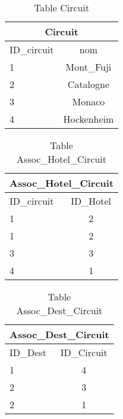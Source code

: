 \documentclass[10pt]{article}
\begin{document}

\begin{table}[h]
\begin{center}
\begin{tabular}{|l|c|}
\hline
\multicolumn{2}{|c|}{Circuit}\\
\hline
ID\_circuit& nom \\
\hline
1 & Mont\_Fuji\\
\hline
2 & Catalogne\\
\hline
3 & Monaco\\
\hline
4 &  Hockenheim\\
\hline
\end{tabular}
\end{center}
\caption{Table Circuit}
\end{table}


\begin{table}[h]
\begin{center}
\begin{tabular}{|l|c|}
\hline
\multicolumn{2}{|c|}{Assoc\_Hotel\_Circuit}\\
\hline
ID\_circuit& ID\_Hotel \\
\hline
1 & 2\\
\hline
1 & 2\\
\hline
3 & 3\\
\hline
4 & 1 \\
\hline
\end{tabular}
\end{center}
\caption{Table Assoc\_Hotel\_Circuit}
\end{table}
\newpage


\begin{table}[h]
\begin{center}
\begin{tabular}{|l|c|}
\hline
\multicolumn{2}{|c|}{Assoc\_Dest\_Circuit}\\
\hline
ID\_Dest& ID\_Circuit \\
\hline
1 & 4\\
\hline
2 & 3\\
\hline
2 & 1\\
\hline
\end{tabular}
\end{center}
\caption{Table Assoc\_Dest\_Circuit}
\end{table}
\end{document}
